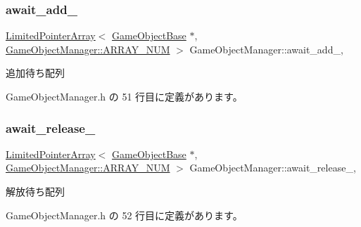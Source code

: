 \mbox{\label{class_game_object_manager_ac63518100cbdf391f137d277276e7824}} 
\subsubsection{\texorpdfstring{await\+\_\+add\+\_\+}{await\_add\_}}
{\footnotesize\ttfamily \mbox{\hyperlink{class_limited_pointer_array}{Limited\+Pointer\+Array}}$<$ \mbox{\hyperlink{class_game_object_base}{Game\+Object\+Base}} $\ast$, \mbox{\hyperlink{class_game_object_manager_a591934d64d750c10c03c908371470681}{Game\+Object\+Manager\+::\+A\+R\+R\+A\+Y\+\_\+\+N\+UM}} $>$ Game\+Object\+Manager\+::await\+\_\+add\+\_\+\hspace{0.3cm}{\ttfamily [static]}, {\ttfamily [private]}}



追加待ち配列 



 Game\+Object\+Manager.\+h の 51 行目に定義があります。

\mbox{\label{class_game_object_manager_aa5dbfcf8c724e1e21279ff9b1bc9fcbe}} 
\subsubsection{\texorpdfstring{await\+\_\+release\+\_\+}{await\_release\_}}
{\footnotesize\ttfamily \mbox{\hyperlink{class_limited_pointer_array}{Limited\+Pointer\+Array}}$<$ \mbox{\hyperlink{class_game_object_base}{Game\+Object\+Base}} $\ast$, \mbox{\hyperlink{class_game_object_manager_a591934d64d750c10c03c908371470681}{Game\+Object\+Manager\+::\+A\+R\+R\+A\+Y\+\_\+\+N\+UM}} $>$ Game\+Object\+Manager\+::await\+\_\+release\+\_\+\hspace{0.3cm}{\ttfamily [static]}, {\ttfamily [private]}}



解放待ち配列 



 Game\+Object\+Manager.\+h の 52 行目に定義があります。

